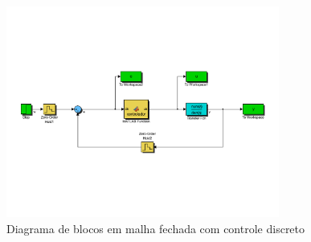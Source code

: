     \begin{figure}[H]
	\center
	\includegraphics[width=0.8\textwidth]{images/ex6simdiscreto.pdf}
	\caption{Diagrama de blocos em malha fechada com controle discreto}
	\label{fig:ex6discreto}
    \end{figure}